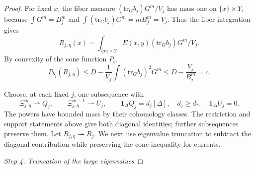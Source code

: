 \documentclass[reqno]{amsart}
\theoremstyle{remark}
\def\tr{\text{tr}}
\theoremstyle{plain}
\begin{document}
\begin{proof}
For fixed $x$, the fiber measure \((\tr_Gb_j) G^m/V_j\) has mass one on $\{x\}\times Y$, because
\(\int G^m=B_j^m\) and \(\int(\tr_Gb_j)G^m=mB_j^m=V_j\). Thus the fiber integration gives \[
R_{j,\eta}(x)=\int_{\{x\}\times Y}E(x,y)(\tr_Gb_j)G^m/V_j.
\]
By convexity of the cone function $P_b$, 
\begin{equation}\label{eq:fiber-cone}
P_{b_j}(R_{j,\eta})
\le D-\frac1{V_j}\int(\tr_Gb_j)^2G^m
\le D-\frac{V_j}{B_j^m}=c.
\end{equation}

Choose, at each fixed \(j\), one subsequence with
\[
\Xi_{j,\eta}^m\rightharpoonup Q_j,\qquad
\Xi_{j,\eta}^{m-1}\rightharpoonup U_j,\qquad
\mathbf1_\Delta Q_j=d_j[\Delta],\quad d_j\ge d_*,\quad
\mathbf1_\Delta U_j=0.
\]
The powers have bounded mass by their cohomology classes. The restriction and support statements above give both diagonal identities; further subsequences preserve them. Let \(R_{j,\eta}\rightharpoonup R_j\). We next use eigenvalue truncation to subtract the diagonal contribution while preserving the cone inequality for currents.

\emph{Step 4. Truncation of the large eigenvalues}


\end{proof}
\end{document}
